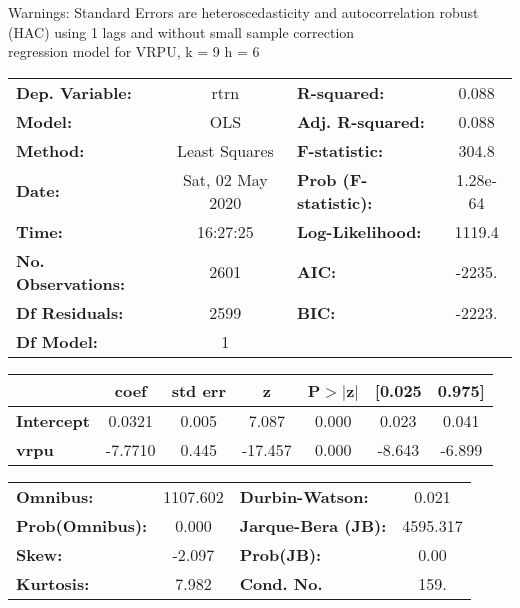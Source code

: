 Warnings: \newline
 [1] Standard Errors are heteroscedasticity and autocorrelation robust (HAC) using 1 lags and without small sample correction\\ 

regression model for VRPU, k = 9 h = 6\begin{center}
\begin{tabular}{lclc}
\toprule
\textbf{Dep. Variable:}    &       rtrn       & \textbf{  R-squared:         } &     0.088   \\
\textbf{Model:}            &       OLS        & \textbf{  Adj. R-squared:    } &     0.088   \\
\textbf{Method:}           &  Least Squares   & \textbf{  F-statistic:       } &     304.8   \\
\textbf{Date:}             & Sat, 02 May 2020 & \textbf{  Prob (F-statistic):} &  1.28e-64   \\
\textbf{Time:}             &     16:27:25     & \textbf{  Log-Likelihood:    } &    1119.4   \\
\textbf{No. Observations:} &        2601      & \textbf{  AIC:               } &    -2235.   \\
\textbf{Df Residuals:}     &        2599      & \textbf{  BIC:               } &    -2223.   \\
\textbf{Df Model:}         &           1      & \textbf{                     } &             \\
\bottomrule
\end{tabular}
\begin{tabular}{lcccccc}
                   & \textbf{coef} & \textbf{std err} & \textbf{z} & \textbf{P$> |$z$|$} & \textbf{[0.025} & \textbf{0.975]}  \\
\midrule
\textbf{Intercept} &       0.0321  &        0.005     &     7.087  &         0.000        &        0.023    &        0.041     \\
\textbf{vrpu}      &      -7.7710  &        0.445     &   -17.457  &         0.000        &       -8.643    &       -6.899     \\
\bottomrule
\end{tabular}
\begin{tabular}{lclc}
\textbf{Omnibus:}       & 1107.602 & \textbf{  Durbin-Watson:     } &    0.021  \\
\textbf{Prob(Omnibus):} &   0.000  & \textbf{  Jarque-Bera (JB):  } & 4595.317  \\
\textbf{Skew:}          &  -2.097  & \textbf{  Prob(JB):          } &     0.00  \\
\textbf{Kurtosis:}      &   7.982  & \textbf{  Cond. No.          } &     159.  \\
\bottomrule
\end{tabular}
\end{center}


